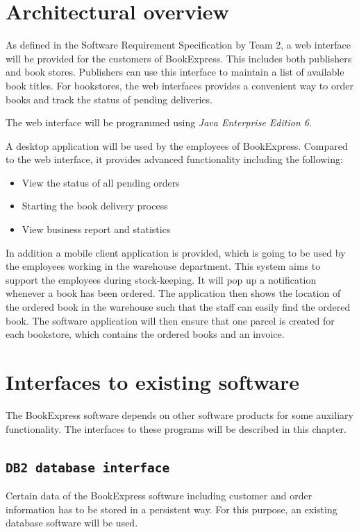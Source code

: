 \chapter{Architectural overview}
As defined in the Software Requirement Specification by Team 2, a web interface will be provided for the customers of BookExpress. This includes both publishers and book stores. Publishers can use this interface to maintain a list of available book titles. For bookstores, the web interfaces provides a convenient way to order books and track the status of pending deliveries.

The web interface will be programmed using \emph{Java Enterprise Edition 6}.

A desktop application will be used by the employees of BookExpress. Compared to the web interface, it provides advanced functionality including the following:
\begin{itemize}
\item View the status of all pending orders
\item Starting the book delivery process
\item View business report and statistics
\end{itemize}

In addition a mobile client application is provided, which is going to be used by the employees working in the warehouse department. This system aims to support the employees during stock-keeping. It will pop up a notification whenever a book has been ordered. The application then shows the location of the ordered book in the warehouse such that the staff can easily find the ordered book. The software application will then ensure that one parcel is created for each bookstore, which contains the ordered books and an invoice.

\chapter{Interfaces to existing software}
The BookExpress software depends on other software products for some auxiliary functionality. The interfaces to these programs will be described in this chapter.
\section{\tt DB2 database interface}
Certain data of the BookExpress software including customer and order information has to be stored in a persistent way. For this purpose, an existing database software will be used.

